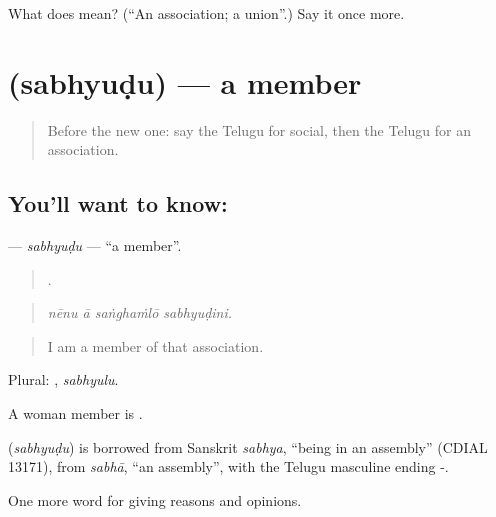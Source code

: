 \begin{tcolorbox}[breakable,colback=teal!4,colframe=teal!35!black,title={Before you move on}]
What does  mean? (\textquotedblleft{}An association; a union\textquotedblright{}.) Say it once more.
\end{tcolorbox}
\section[\texorpdfstring{\te{సభ్యుడు} (sabhyuḍu)}{సభ్యుడు (sabhyuḍu)}]{ (sabhyuḍu) — a member}

\label{lesson:TE-C408-sabhyudu}



\begin{quote}
Before the new one: say the Telugu for social, then the Telugu for an association.
\end{quote}

\subsection*{You'll want to know: }
\textbf{} — \emph{sabhyuḍu} — \textquotedblleft{}a member\textquotedblright{}.

\begin{quote}
   .
\end{quote}

\begin{quote}
\emph{nēnu ā saṅghaṁlō sabhyuḍini.}
\end{quote}

\begin{quote}
I am a member of that association.
\end{quote}

Plural: , \emph{sabhyulu}.

A woman member is .

\begin{cousinweb}
\textbf{} (\emph{sabhyuḍu}) is borrowed from Sanskrit \emph{sabhya}, \textquotedblleft{}being in an assembly\textquotedblright{} (CDIAL 13171), from \emph{sabhā}, \textquotedblleft{}an assembly\textquotedblright{}, with the Telugu masculine ending -.
\end{cousinweb}

\begin{grammarlens}[title={What you've built}]
One more word for giving reasons and opinions.
\end{grammarlens}

